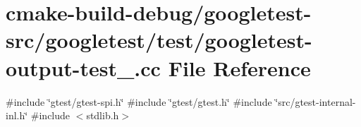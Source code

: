 \hypertarget{googletest-output-test___8cc}{}\section{cmake-\/build-\/debug/googletest-\/src/googletest/test/googletest-\/output-\/test\+\_\+.cc File Reference}
\label{googletest-output-test___8cc}
{\ttfamily \#include \char`\"{}gtest/gtest-\/spi.\+h\char`\"{}}\newline
{\ttfamily \#include \char`\"{}gtest/gtest.\+h\char`\"{}}\newline
{\ttfamily \#include \char`\"{}src/gtest-\/internal-\/inl.\+h\char`\"{}}\newline
{\ttfamily \#include $<$stdlib.\+h$>$}\newline
